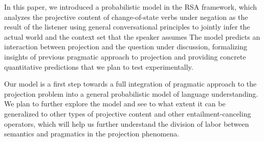 
In this paper, we introduced a probabilistic model in the RSA framework, 
which analyzes the projective content of change-of-state verbs 
 under negation as the result of the listener using general conversational principles to jointly infer the actual world and the context set that the speaker assumes
The model predicts an interaction between projection and the question under discussion, formalizing 
 insights of previous pragmatic approach to projection and providing 
 concrete quantitative predictions that we plan to test experimentally. 

 
Our model is a first step towards a full integration of pragmatic 
 approach to the projection problem into a general probabilistic model
 of language understanding. We plan to further explore the model and 
  see to what extent it can be generalized to
  other types of projective content and other entailment-canceling
  operators, which will help us further understand the division of labor 
  between semantics and pragmatics in the projection phenomena.


